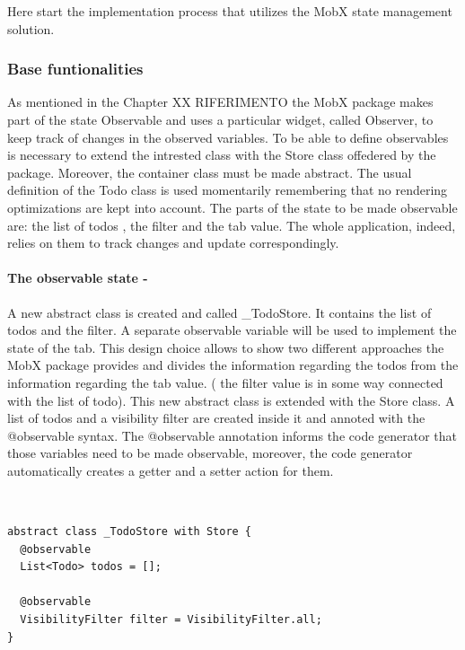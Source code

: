 Here start the implementation process that utilizes the MobX state management solution.

\subsubsection{Base funtionalities}  \label{par:todo_app_inherited_widget_introduction} 
 
As mentioned in the Chapter XX RIFERIMENTO the MobX package makes part of the state Observable and uses a particular widget, called Observer, to keep track of changes in the observed variables. To be able to define observables is necessary to extend the intrested class with the Store class offedered by the package. Moreover, the container class must be made abstract. The usual definition of the Todo class is used momentarily remembering that no rendering optimizations are kept into account. The parts of the state to be made observable are: the list of todos , the filter and the tab value. The whole application, indeed, relies on them to track changes and update correspondingly. 
\paragraph{The observable state - }
\label{subpar:todo_app_bloc_core_state}A new abstract class is created and called \_TodoStore. It contains the list of todos and the filter. A separate observable variable will be used to implement the state of the tab. This design choice allows to show two different approaches the MobX package provides and divides the information regarding the todos from the information regarding the tab value. ( the filter value is in some way connected with the list of todo). This new abstract class is extended with the Store class. A list of todos and a visibility filter are created inside it and annoted with the @observable syntax. The @observable annotation informs the code generator that those variables need to be made observable, moreover, the code generator automatically creates a getter and a setter action for them. 
\begin{code}
\mbox{}\\
 \mbox{}
		\label{code:2.14}
\begin{verbatim}
abstract class _TodoStore with Store {
  @observable
  List<Todo> todos = [];

  @observable
  VisibilityFilter filter = VisibilityFilter.all;
}
\end{verbatim}
\mbox{}
\end{code}

